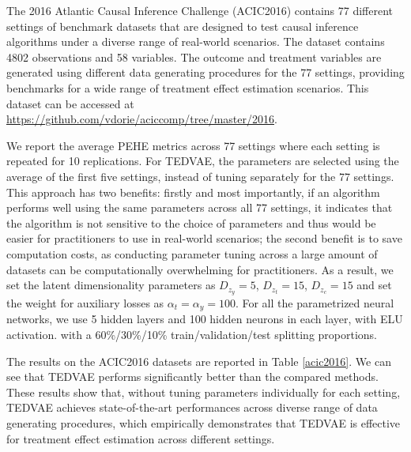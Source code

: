 \documentclass[letterpaper]{article} %
\begin{document}
The 2016 Atlantic Causal Inference Challenge (ACIC2016) \cite{Dorie2019} contains 77 different settings of benchmark datasets that are designed to test causal inference algorithms under a diverse range of real-world scenarios.
The dataset contains 4802 observations and 58 variables. The outcome and treatment variables are generated using different data generating procedures for the 77 settings, providing benchmarks for a wide range of treatment effect estimation scenarios. This dataset can be accessed at \url{https://github.com/vdorie/aciccomp/tree/master/2016}.

We report the average PEHE metrics across 77 settings where each setting is repeated for 10 replications. For TEDVAE, the parameters are selected using the average of the first five settings, instead of tuning separately for the 77 settings. This approach has two benefits: firstly and most importantly, if an algorithm performs well using the same parameters across all 77 settings, it indicates that the algorithm is not sensitive to the choice of parameters and thus would be easier for practitioners to use in real-world scenarios; the second benefit is to save computation costs, as conducting parameter tuning across a large amount of datasets can be computationally overwhelming for practitioners.
As a result, we set the latent dimensionality parameters as $D_{z_y}=5$, $D_{z_t}=15$, $D_{z_c}=15$ and set the weight for auxiliary losses as $\alpha_t=\alpha_y=100$. For all the parametrized neural networks, we use 5 hidden layers and 100 hidden neurons in each layer, with ELU activation.   with a 60\%/30\%/10\% train/validation/test splitting proportions.

The results on the ACIC2016 datasets are reported in Table \ref{acic2016}. We can see that TEDVAE performs significantly better than the compared methods.
These results show that, without tuning parameters individually for each setting, TEDVAE achieves state-of-the-art performances across diverse range of data generating procedures, which empirically demonstrates that TEDVAE is effective for treatment effect estimation across different settings.
\end{document}
